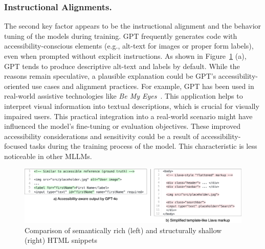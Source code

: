 \subsubsection{Instructional Alignments.} The second key 
factor appears to be the instructional alignment
and the behavior tuning of the models during training. GPT 
frequently generates code with accessibility-conscious elements
(e.g., alt-text for images or proper form labels), even when 
prompted without explicit instructions. As shown in 
Figure~\ref{fig:generalcapabilities} (a), GPT tends to produce 
descriptive alt-text and labels by default.\newline
While the reasons remain speculative, a plausible explanation 
could be GPT's accessibility-oriented use cases and 
alignment practices. For example, GPT has been used 
in real-world assistive technologies like \textit{Be My Eyes}~\cite{web:bemyeyes}. 
This application helps to interpret visual information into 
textual descriptions, which is crucial for visually impaired users.
This practical integration into a real-world scenario might 
have influenced the model's fine-tuning or evaluation objectives.
These improved accessibility considerations and sensitivity could 
be a result of accessibility-focused tasks during the training 
process of the model. This characteristic is less noticeable in 
other MLLMs.

\begin{figure}
  \centering
  \includegraphics[width=1\linewidth]{figures/generalcapability.png}
  \caption{Comparison of semantically rich (left) and structurally shallow (right) HTML snippets}
  \label{fig:generalcapabilities} 
\end{figure}

\newpage
